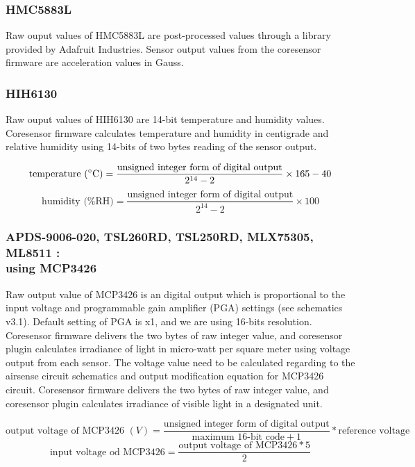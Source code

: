 \subsubsection{ HMC5883L}

Raw ouput values of HMC5883L are post-processed values through a library provided by Adafruit Industries. Sensor output values from the coresensor firmware are acceleration values in Gauss.

\subsubsection{ HIH6130}

Raw ouput values of HIH6130 are 14-bit temperature and humidity values. Coresensor firmware calculates temperature and humidity in centigrade and relative humidity using 14-bits of two bytes reading of the sensor output.

{\centering
 \[ \text{temperature (\degree C)} = \frac{\text{unsigned integer form of digital output}}{2^{14} - 2} \times 165 - 40 \] 
 \[ \text{humidity (\%RH)} = \frac{\text{unsigned integer form of digital output}}{2^{14} - 2} \times 100 \]
 \par
 }


\subsubsection[MCP3426]{ APDS-9006-020, TSL260RD, TSL250RD, MLX75305, ML8511 : \\ using MCP3426}

Raw output value of MCP3426 is an digital output which is proportional to the input voltage and programmable gain amplifier (PGA) settings (see schematics v3.1). Default setting of PGA is x1, and we are using 16-bits resolution. Coresensor firmware delivers the two bytes of raw integer value, and coresensor plugin calculates irradiance of light in micro-watt per square meter using voltage output from each sensor. The voltage value need to be calculated regarding to the airsense circuit schematics and output modification equation for MCP3426 circuit. Coresensor firmware delivers the two bytes of raw integer value, and coresensor plugin calculates irradiance of visible light in a designated unit.

{\centering
 \[ \text{output voltage of MCP3426 }(V) = \frac{\text{unsigned integer form of digital output}}{\text{maximum 16-bit code} + 1} * \text{reference voltage} \]
 \[ \text{input voltage od MCP3426} = \frac{\text{output voltage of MCP3426} * 5}{2} \]
 \par
 }

